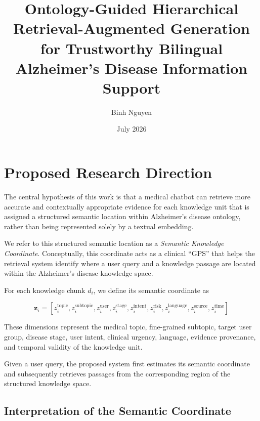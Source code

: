 \documentclass{article}
\title{Ontology-Guided Hierarchical Retrieval-Augmented Generation for Trustworthy Bilingual Alzheimer’s Disease Information Support}
\author{Binh Nguyen}
\date{July 2026}
\begin{document}
\maketitle



\section{Proposed Research Direction}

The central hypothesis of this work is that a medical chatbot can retrieve more accurate and contextually appropriate evidence for each knowledge unit that is assigned a structured semantic location within Alzheimer's disease ontology, rather than being represented solely by a textual embedding.

We refer to this structured semantic location as a 
\textit{Semantic Knowledge Coordinate}. Conceptually, this coordinate acts as a clinical ``GPS'' that helps the retrieval system identify where a user query and a knowledge passage are located within the Alzheimer's disease knowledge space.

For each knowledge chunk $d_i$, we define its semantic coordinate as

\begin{equation}
    \mathbf{z}_i =
    \left[
    z_i^{\mathrm{topic}},
    z_i^{\mathrm{subtopic}},
    z_i^{\mathrm{user}},
    z_i^{\mathrm{stage}},
    z_i^{\mathrm{intent}},
    z_i^{\mathrm{risk}},
    z_i^{\mathrm{language}},
    z_i^{\mathrm{source}},
    z_i^{\mathrm{time}}
    \right]
\end{equation}

These dimensions represent the medical topic, fine-grained subtopic, target user group, disease stage, user intent, clinical urgency, language, evidence provenance, and temporal validity of the knowledge unit.

Given a user query, the proposed system first estimates its semantic coordinate and subsequently retrieves passages from the corresponding region of the structured knowledge space.




\subsection{Interpretation of the Semantic Coordinate}
\end{document}
